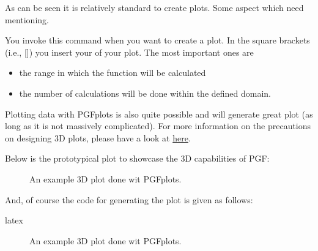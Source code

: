 \documentclass[minted, draw]{../tex/hebdomon}
\begin{document}
As can be seen it is relatively standard to create plots. Some aspect
which need mentioning.

\begin{hgitemize}
	\item[\pcode{\addplot}] You invoke this command when you want to
	create a plot. In the square brackets (i.e., []) you insert your
	 of your plot. The most important ones are
	\begin{itemize}
		\item[\pcode{domain}] the range in which the function will be
		      calculated
		\item[\pcode{sample}] the number of calculations will be done
		      within the defined domain.
	\end{itemize}
\end{hgitemize}


Plotting data with PGFplots is also quite possible and will generate
great plot (as long as it is not massively complicated). For more
information on the precautions on designing 3D plots, please have a look
at \href{https://tikz.dev/pgfplots/reference-3dplots}{here}.

Below is the prototypical plot to showcase the 3D capabilities of PGF:

\begin{figure}[!ht]
	\centering
	\caption{An example 3D plot done wit PGFplots.}
\end{figure}

And, of course the code for generating the plot is given as follows:

\begin{code}{latex}
\begin{figure}[!ht]
  \centering
  \caption{An example 3D plot done wit PGFplots.}
\end{figure}
\end{code}
\end{document}
